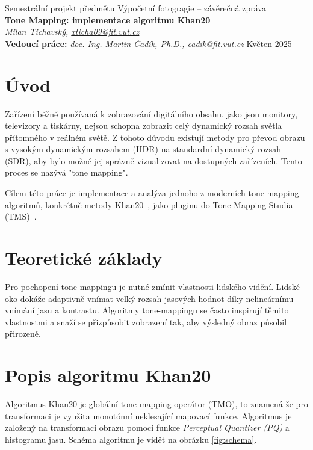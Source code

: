\documentclass[11pt,a4paper,oneside]{article}
\begin{document}
\thispagestyle{empty}
\begin{center}
\vspace*{60mm}
{Semestrální projekt předmětu Výpočetní fotogragie -- závěrečná zpráva }\\
\smallskip
{\Large\bf Tone Mapping: implementace algoritmu Khan20}\\
\smallskip
{\it Milan Tichavský, \url{xticha09@fit.vut.cz}}\\
\vfill
{\bf Vedoucí práce:} {\it doc. Ing. Martin Čadík, Ph.D., \url{cadik@fit.vut.cz}} 
\hfill {Květen 2025}


\end{center}
\newpage


\section{Úvod}

Zařízení běžně používaná k zobrazování digitálního obsahu, jako jsou monitory,
televizory a tiskárny, nejsou schopna zobrazit celý dynamický rozsah světla
přítomného v reálném světě. Z tohoto důvodu existují metody pro převod obrazu s
vysokým dynamickým rozsahem (HDR) na standardní dynamický rozsah (SDR), aby bylo
možné jej správně vizualizovat na dostupných zařízeních. Tento proces se nazývá
"tone mapping".

Cílem této práce je implementace a analýza jednoho z moderních tone-mapping
algoritmů, konkrétně metody Khan20~\cite{Khan2020}, jako pluginu do Tone Mapping
Studia (TMS)~\cite{TMS2025}.

\section{Teoretické základy}

Pro pochopení tone-mappingu je nutné zmínit vlastnosti lidského vidění. Lidské
oko dokáže adaptivně vnímat velký rozsah jasových hodnot díky nelineárnímu
vnímání jasu a kontrastu. Algoritmy tone-mappingu se často inspirují těmito
vlastnostmi a snaží se přizpůsobit zobrazení tak, aby výsledný obraz působil
přirozeně.

\section{Popis algoritmu Khan20}

Algoritmus Khan20 je globální tone-mapping operátor (TMO), to znamená že pro
transformaci je využita monotónní neklesající mapovací funkce. 
Algoritmus je založený na transformaci obrazu pomocí funkce \textit{Perceptual
Quantizer (PQ)} a histogramu jasu. Schéma algoritmu je vidět na obrázku
\ref{fig:schema}.
\end{document}
